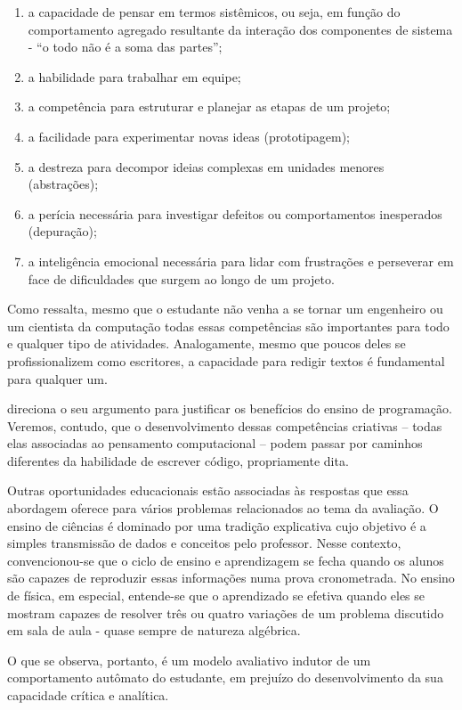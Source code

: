 \begin{enumerate}
  \item a capacidade de pensar em termos sistêmicos, ou seja, em função do comportamento agregado resultante da interação dos componentes de sistema - ``o todo não é a soma das partes''; 
  \item a habilidade para trabalhar em equipe;
  \item a competência para estruturar e planejar as etapas de um projeto;
  \item a facilidade para experimentar novas ideas (prototipagem); 
  \item a destreza para decompor ideias complexas em unidades menores (abstrações);
  \item a perícia necessária para investigar defeitos ou comportamentos inesperados (depuração);
  \item a inteligência emocional necessária para lidar com frustrações e perseverar em face de dificuldades que surgem ao longo de um projeto.  
\end{enumerate}

Como ressalta, mesmo que o estudante não venha a se tornar um engenheiro ou um cientista da computação todas essas competências são importantes para todo e qualquer tipo de atividades. Analogamente, mesmo que poucos deles se profissionalizem como escritores, a capacidade para redigir textos é fundamental para qualquer um.

 direciona o seu argumento para justificar os benefícios do ensino de programação. Veremos, contudo, que o desenvolvimento dessas competências criativas -- todas elas associadas ao pensamento computacional -- podem passar por caminhos diferentes da habilidade de escrever código, propriamente dita. 

Outras oportunidades educacionais estão associadas às respostas que essa abordagem oferece para vários problemas relacionados ao tema da avaliação. O ensino de ciências é dominado por uma tradição explicativa cujo objetivo é a simples transmissão de dados e conceitos pelo professor. Nesse contexto, convencionou-se que o ciclo de ensino e aprendizagem se fecha quando os alunos são capazes de reproduzir essas informações numa prova cronometrada. No ensino de física, em especial, entende-se que o aprendizado se efetiva quando eles se mostram capazes de resolver três ou quatro variações de um problema  discutido em sala de aula - quase sempre de natureza algébrica. 

O que se observa, portanto, é um modelo avaliativo indutor de um comportamento autômato do estudante, em prejuízo do desenvolvimento da sua capacidade crítica e analítica.

